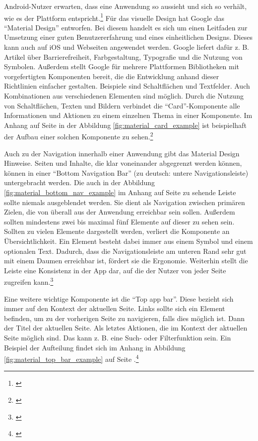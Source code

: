 Android-Nutzer erwarten, dass eine Anwendung so aussieht und sich so verhält, wie es der Plattform entspricht.\footnote{\cite[Vgl.][]{AndroidDocDesign2019}} Für das visuelle Design hat Google das \enquote{Material Design} entworfen. Bei diesem handelt es sich um einen Leitfaden zur Umsetzung einer guten Benutzererfahrung und eines einheitlichen Designs. Dieses kann auch auf iOS und Webseiten angewendet werden. Google liefert dafür z. B. Artikel über Barrierefreiheit, Farbgestaltung, Typografie und die Nutzung von Symbolen. Außerdem stellt Google für mehrere Plattformen Bibliotheken mit vorgefertigten Komponenten bereit, die die Entwicklung anhand dieser Richtlinien einfacher gestalten. Beispiele sind Schaltflächen und Textfelder. Auch Kombinationen aus verschiedenen Elementen sind möglich. Durch die Nutzung von Schaltflächen, Texten und Bildern verbindet die \enquote{Card}-Komponente alle Informationen und Aktionen zu einem einzelnen Thema in einer Komponente. Im Anhang auf Seite \pageref{fig:material_card_example} in der Abbildung \ref{fig:material_card_example} ist beispielhaft der Aufbau einer solchen Komponente zu sehen.\footnote{\cite[Vgl.][]{MaterialFoundation2021}}

Auch zu der Navigation innerhalb einer Anwendung gibt das Material Design Hinweise. Seiten und Inhalte, die klar voneinander abgegrenzt werden können, können in einer \enquote{Bottom Navigation Bar} (zu deutsch: untere Navigationsleiste) untergebracht werden. Die auch in der Abbildung \ref{fig:material_bottom_nav_example} im Anhang auf Seite \pageref{fig:material_bottom_nav_example} zu sehende Leiste sollte niemals ausgeblendet werden. Sie dient als Navigation zwischen primären Zielen, die von überall aus der Anwendung erreichbar sein sollen. Außerdem sollten mindestens zwei bis maximal fünf Elemente auf dieser zu sehen sein. Sollten zu vielen Elemente dargestellt werden, verliert die Komponente an Übersichtlichkeit. Ein Element besteht dabei immer aus einem Symbol und einem optionalen Text. Dadurch, dass die Navigationsleiste am unteren Rand sehr gut mit einem Daumen erreichbar ist, fördert sie die Ergonomie. Weiterhin stellt die Leiste eine Konsistenz in der App dar, auf die der Nutzer von jeder Seite zugreifen kann.\footnote{\cite[Vgl.][]{MaterialBottomNav2021}}

Eine weitere wichtige Komponente ist die \enquote{Top app bar}. Diese bezieht sich immer auf den Kontext der aktuellen Seite. Links sollte sich ein Element befinden, um zu der vorherigen Seite zu navigieren, falls dies möglich ist. Dann der Titel der aktuellen Seite. Als letztes Aktionen, die im Kontext der aktuellen Seite möglich sind. Das kann z. B. eine Such- oder Filterfunktion sein. Ein Beispiel der Aufteilung findet sich im Anhang in Abbildung \ref{fig:material_top_bar_example} auf Seite \pageref{fig:material_top_bar_example}.\footnote{\cite[Vgl.][]{MaterialTopBar2021}}

